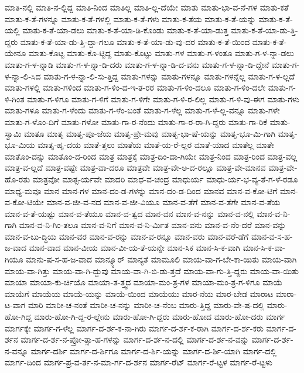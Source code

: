 {ಮಾತಿ-ನಲ್ಲಿ
ಮಾತಿ-ನ-ಲ್ಲಿದ್ದ
ಮಾತಿ-ನಿಂದ
ಮಾತಿಲ್ಲ
ಮಾತಿ-ಲ್ಲ-ದೆಯೇ
ಮಾತು
ಮಾತು-ಭಾ-ವ-ನೆ-ಗಳ
ಮಾತು-ಕತೆ
ಮಾತು-ಕ-ತೆ-ಗಳನ್ನೂ
ಮಾತು-ಕ-ತೆ-ಗಳಲ್ಲಿ
ಮಾತು-ಕ-ತೆ-ಗಳು
ಮಾತು-ಕ-ತೆಯ
ಮಾತು-ಕ-ತೆ-ಯನ್ನು
ಮಾತು-ಕ-ತೆ-ಯಲ್ಲಿ
ಮಾತು-ಕ-ತೆ-ಯಾ-ಡಲು
ಮಾತು-ಕ-ತೆ-ಯಾ-ಡಿ-ಕೊಂಡು
ಮಾತು-ಕ-ತೆ-ಯಾ-ಡುತ್ತ
ಮಾತು-ಕ-ತೆ-ಯಾ-ಡು-ತ್ತಿ-ದ್ದರು
ಮಾತು-ಕ-ತೆ-ಯಾ-ಡು-ತ್ತಿ-ದ್ದಾ-ಗಲೂ
ಮಾತು-ಕ-ತೆ-ಯಾ-ಡು-ವು-ದರ
ಮಾತು-ಕ-ತೆ-ಯಿಂದ
ಮಾತು-ಕ-ತೆ-ಯೇನೂ
ಮಾತು-ಕೊಟ್ಟ
ಮಾತು-ಕೊ-ಟ್ಟಿದ್ದ
ಮಾತು-ಕೊಟ್ಟು
ಮಾತು-ಗಳ
ಮಾತು-ಗ-ಳಂತೂ
ಮಾತು-ಗ-ಳ-ನ್ನಾ-ಡಲು
ಮಾತು-ಗ-ಳ-ನ್ನಾಡಿ
ಮಾತು-ಗ-ಳ-ನ್ನಾ-ಡಿ-ದರು
ಮಾತು-ಗ-ಳ-ನ್ನಾ-ಡಿ-ದ-ವನು
ಮಾತು-ಗ-ಳ-ನ್ನಾ-ಡಿ-ದ್ದೇನೆ
ಮಾತು-ಗ-ಳ-ನ್ನಾ-ಲಿ-ಸಿದ
ಮಾತು-ಗ-ಳ-ನ್ನಾ-ಲಿ-ಸು-ತ್ತಿದ್ದ
ಮಾತು-ಗಳನ್ನು
ಮಾತು-ಗಳನ್ನೂ
ಮಾತು-ಗಳನ್ನೆಲ್ಲ
ಮಾತು-ಗ-ಳ-ಲ್ಲದೆ
ಮಾತು-ಗಳಲ್ಲಿ
ಮಾತು-ಗಳಿಂದ
ಮಾತು-ಗ-ಳಿಂ-ದ-ಇ-ತ-ರರ
ಮಾತು-ಗ-ಳಿಂ-ದಲೂ
ಮಾತು-ಗ-ಳಿಂ-ದಲೇ
ಮಾತು-ಗ-ಳಿ-ಗಿಂತ
ಮಾತು-ಗ-ಳಿಗೂ
ಮಾತು-ಗ-ಳಿಗೆ
ಮಾತು-ಗ-ಳಿಗೇ
ಮಾತು-ಗ-ಳಿ-ರ-ಲಿಲ್ಲ
ಮಾತು-ಗ-ಳಿ-ವು-ಈಗ
ಮಾತು-ಗಳು
ಮಾತು-ಗಳೂ
ಮಾತು-ಗ-ಳೆಂದು
ಮಾತು-ಗ-ಳೆಂ-ಬಂತೆ
ಮಾತು-ಗ-ಳೆಲ್ಲ
ಮಾತು-ಗ-ಳೆ-ಲ್ಲ-ವನ್ನೂ
ಮಾತು-ಗಳೇ
ಮಾತು-ಗ-ಳೊಂ-ದಿಗೆ
ಮಾತು-ಗಳೋ
ಮಾತು-ಗಾ-ರ-ನೆಂದು
ಮಾತು-ಗಾ-ರ-ರಾ-ಗಿ-ದ್ದರು
ಮಾತು-ಗಾ-ರಿಕೆ
ಮಾತು-ಸ್ವಾಮಿ
ಮಾತೂ
ಮಾತೃ
ಮಾತೃ-ಪೂ-ಜೆಯ
ಮಾತೃ-ಪ್ರೇ-ಮವು
ಮಾತೃ-ಭಾ-ಷೆ-ಯನ್ನು
ಮಾತೃ-ಭೂ-ಮಿ-ಗಾಗಿ
ಮಾತೃ-ಭೂ-ಮಿಯ
ಮಾತೃ-ಹೃ-ದಯ
ಮಾತೆ-ತ್ತಲು
ಮಾತೆಯ
ಮಾತೆ-ಯ-ರೆ-ಲ್ಲರ
ಮಾತೆ-ಯಾದ
ಮಾತೆಲ್ಲ
ಮಾತೇ
ಮಾತೊಂ-ದನ್ನು
ಮಾತೊಂ-ದ-ರಿಂದ
ಮಾತ್ರ
ಮಾತ್ರಕ್ಕೆ
ಮಾತ್ರ-ದಿಂ-ದಾ-ಗಿಯೇ
ಮಾತ್ರ-ನಿಂದ
ಮಾತ್ರ-ರಿಂದ
ಮಾತ್ರ-ವಲ್ಲ
ಮಾತ್ರ-ವ-ಲ್ಲದೆ
ಮಾತ್ರ-ವಷ್ಟೇ
ಮಾತ್ರ-ವಾ-ದರೂ
ಮಾತ್ರವೇ
ಮಾತ್ರ-ವೇ-ಅ-ದ-ರಲ್ಲೂ
ಮಾತ್ರ-ವೇ-ಮಾನವ
ಮಾತ್ರ-ವೇ-ಹೊ-ರತು
ಮಾತ್ರವೋ
ಮಾತ್ಸ-ರ್ಯವೇ
ಮಾದರಿ
ಮಾಧ-ವ-ಚಂದ್ರ
ಮಾಧುರ್ಯ
ಮಾಧು-ರ್ಯ-ಭ-ವ್ಯ-ತೆ-ಗ-ಳೆ-ರಡೂ
ಮಾಧ್ಯ-ಮವೂ
ಮಾನ
ಮಾನ-ಗಳ
ಮಾನ-ದಂ-ಡ-ಗಳನ್ನು
ಮಾನ-ದಂ-ಡ-ದಿಂದ
ಮಾನವ
ಮಾನ-ವ-ಕೋ-ಟಿಗೆ
ಮಾನ-ವ-ಕೋ-ಟಿಯೇ
ಮಾನ-ವ-ಜೀ-ವ-ನದ
ಮಾನ-ವ-ಜೀ-ವಿಯೂ
ಮಾನ-ವ-ತೆಗೆ
ಮಾನ-ವ-ತೆಗೇ
ಮಾನ-ವ-ತೆಯ
ಮಾನ-ವ-ತೆ-ಯಷ್ಟು
ಮಾನ-ವ-ತೆಯೂ
ಮಾನ-ವ-ತ್ವದ
ಮಾನ-ವನ
ಮಾನ-ವ-ನನ್ನು
ಮಾನ-ವ-ನಲ್ಲಿ
ಮಾನ-ವ-ನಿ-ಗಾಗಿ
ಮಾನ-ವ-ನಿ-ಗಿಂ-ತಲೂ
ಮಾನ-ವ-ನಿಗೆ
ಮಾನ-ವ-ನಿ-ರ್ಮಿತ
ಮಾನ-ವನು
ಮಾನ-ವ-ನೆಂ-ದರೆ
ಮಾನ-ವನ್ನು
ಮಾನ-ವ-ಬು-ದ್ಧಿಯ
ಮಾನ-ವರ
ಮಾನ-ವ-ರನ್ನು
ಮಾನ-ವ-ರನ್ನೂ
ಮಾನ-ವರು
ಮಾನ-ವರೆ-ಡೆಗೆ
ಮಾನ-ವ-ಸ-ಹ-ಜ-ವಾದ
ಮಾನ-ವಾದ
ಮಾನ-ವೀಯ
ಮಾನ-ವೀ-ಯ-ತೆ-ಯನ್ನೇ
ಮಾನ-ಸಿಕ
ಮಾನ-ಸಿ-ಕ-ವಾಗಿ
ಮಾನ-ಸಿ-ಕ-ವಾ-ಗಿಯೂ
ಮಾನು-ಷ-ಸ-ಹ-ಜ-ವಾದ
ಮಾನ್ಕ್ಯೂರ್
ಮಾನ್ಯತೆ
ಮಾಮೂಲಿ
ಮಾಯ-ವಾ-ಗ-ಬೇ-ಕಾ-ಯಿತು
ಮಾಯ-ವಾಗಿ
ಮಾಯ-ವಾ-ಗಿತ್ತು
ಮಾಯ-ವಾ-ಗಿ-ದ್ದುವು
ಮಾಯ-ವಾ-ಗಿ-ಬಿ-ಡು-ತ್ತದೆ
ಮಾಯ-ವಾ-ಗು-ತ್ತಿ-ದ್ದರು
ಮಾಯ-ವಾ-ಯಿತು
ಮಾಯಾ
ಮಾಯಾ-ಕು-ರ್ಚಿಯೊ
ಮಾಯಾ-ತ-ತ್ತ್ವದ
ಮಾಯಾ-ಮಂ-ತ್ರ-ಗಳ
ಮಾಯಾ-ಮಂ-ತ್ರ-ಗ-ಳಿಗೂ
ಮಾಯೆ
ಮಾಯೆಗೆ
ಮಾಯೆಯ
ಮಾಯೆ-ಯನ್ನು
ಮಾಯೆ-ಯಿಂದ
ಮಾಯೆಯು
ಮಾರ-ನೆಯ
ಮಾರ-ಬೇಡ
ಮಾರಾಟ
ಮಾರಾ-ಟ-ವಾಗ
ಮಾರಿ
ಮಾರೀ-ಚ-ನಂತೆ
ಮಾರೀ-ಚ-ನನ್ನು
ಮಾರೀ-ಚ-ನೆಂಬ
ಮಾರು-ತ್ತಿದ್ದ
ಮಾರು-ವೇ-ಷ-ದಲ್ಲಿ
ಮಾರು-ಹೋ-ಗಿದ್ದ
ಮಾರು-ಹೋ-ಗಿ-ದ್ದ-ರ-ಲ್ಲೇನು
ಮಾರು-ಹೋ-ಗಿ-ದ್ದರು
ಮಾರು-ಹೋದ
ಮಾರು-ಹೋ-ದರು
ಮಾರ್ಗ
ಮಾರ್ಗಕ್ಕೇ
ಮಾರ್ಗ-ಗ-ಳೆಲ್ಲ
ಮಾರ್ಗ-ದ-ರ್ಶ-ಕ-ನಾ-ಗಿರು
ಮಾರ್ಗ-ದ-ರ್ಶ-ಕ-ರಾಗಿ
ಮಾರ್ಗ-ದ-ರ್ಶ-ಕರು
ಮಾರ್ಗ-ದ-ರ್ಶನ
ಮಾರ್ಗ-ದ-ರ್ಶ-ನ-ಪ್ರೋ-ತ್ಸಾ-ಹ-ಗಳನ್ನು
ಮಾರ್ಗ-ದ-ರ್ಶ-ನ-ದಲ್ಲಿ
ಮಾರ್ಗ-ದ-ರ್ಶ-ನ-ವನ್ನು
ಮಾರ್ಗ-ದ-ರ್ಶ-ನ-ವನ್ನೂ
ಮಾರ್ಗ-ದರ್ಶಿ
ಮಾರ್ಗ-ದ-ರ್ಶಿಗೂ
ಮಾರ್ಗ-ದ-ರ್ಶಿ-ಯನ್ನು
ಮಾರ್ಗ-ದ-ರ್ಶಿ-ಯಾಗಿ
ಮಾರ್ಗ-ದಲ್ಲಿ
ಮಾರ್ಗ-ದಿಂದ
ಮಾರ್ಗ-ಪ್ರ-ವ-ರ್ತ-ನ-ಮಾ-ರ್ಗ-ದ-ರ್ಶನ
ಮಾರ್ಗ-ರೆಟ್
ಮಾರ್ಗ-ರೆ-ಟ್ಟಳ
ಮಾರ್ಗ-ರೆ-ಟ್ಟಳು
}
